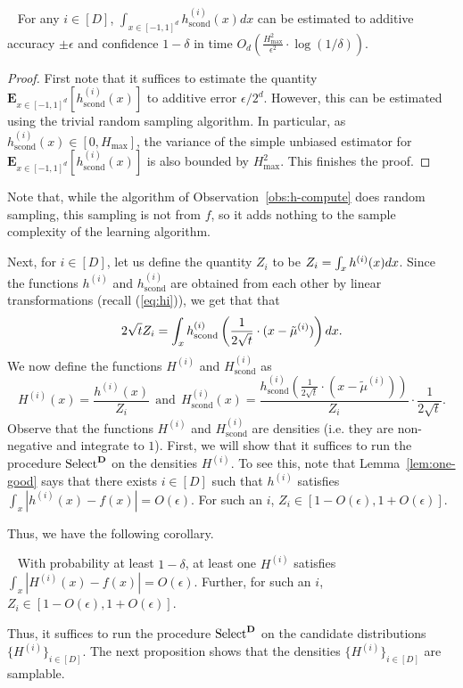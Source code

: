 \begin{observation}~\label{obs:h-compute}
For any $i \in [D]$, $\int_{x \in [-1,1]^d} {h}_{\mathrm{scond}}^{(i)} (x) dx$ can be 
estimated to additive accuracy $\pm \epsilon$  and confidence $1-\delta$  in time $O_d\left( \frac{H_{\max}^2}{\epsilon^2} \cdot \log (1/\delta)\right)$. 
\end{observation}
\begin{proof}
First note that it suffices to estimate
the quantity  $\mathbf{E}_{x \in [-1,1]^d} 
[{h}_{\mathrm{scond}}^{(i)} (x)]$ to additive error $\epsilon/2^d$. However, this can be estimated using the trivial random sampling algorithm. In particular,  as 
${h}_{\mathrm{scond}}^{(i)}(x) \in [0,H_{\max}]$, the variance of the simple unbiased estimator for $\mathbf{E}_{x \in [-1,1]^d} 
[{h}_{\mathrm{scond}}^{(i)} (x)]$ is also bounded by $H_{\max}^2$. This finishes the proof.  
\end{proof}

Note that, while the algorithm of Observation~\ref{obs:h-compute} does random sampling, this sampling
is not from $f$, so it adds nothing to the sample complexity of the learning algorithm.

Next, for $i \in [D]$, let us define the quantity $Z_i$ to be $Z_i = \int_{x\ignore{\in [-1,1]^d}} {h}^{(i)}(x) dx$. Since the functions ${h}^{(i)}$  and ${h}_{\mathrm{scond}}^{(i)}$ are obtained from each other by linear transformations (recall (\ref{eq:hi})),
we get that that 
\[
2 \sqrt{t} Z_i = \int_{x\ignore{\in [-1,1]^d}} {h}_{\mathrm{scond}}^{(i)}\left({\frac 1 {2\sqrt{t}}} \cdot (x-\tilde{\mu}^{(i)})\right) dx. 
\]
We now define the functions ${H}^{(i)}$ and ${H}_{\mathrm{scond}}^{(i)}$ as
\[
{H}^{(i)} (x) = \frac{{h}^{(i)}(x)}{Z_i} \ \ \textrm{and} \  \ {H}_{\mathrm{scond}}^{(i)}(x) = \frac{{h}_{\mathrm{scond}}^{(i)}(
{\frac 1 {2\sqrt{t}}} \cdot (x-\tilde{\mu}^{(i)}))}{Z_i} \cdot {\frac 1 {2\sqrt{t}}} .
\]
Observe that the functions ${H}^{(i)}$ and ${H}_{\mathrm{scond}}^{(i)}$ are densities (i.e. they are non-negative and integrate to $1$). 
First, we will show that it suffices to run the procedure $\mathrm{Select}^{\bD}$ on the densities ${H}^{(i)}$. 
To see this, note that  Lemma~\ref{lem:one-good} says that there exists $i \in [D]$ such that $h^{(i)}$ satisfies $\int_x |h^{(i)}(x) - f(x)| = O(\epsilon)$. For such an $i$, $Z_i \in [1-O(\epsilon), 1+ O(\epsilon)]$. 
Thus, we have the following corollary. 
\begin{corollary}~\label{corr:one-good}
With probability at least $1-\delta$, at least one ${H}^{(i)}$ satisfies $\int_x |{H}^{(i)}(x) - f(x)| = O(\epsilon)$. Further, for such an $i$, $Z_i \in [1-O(\epsilon), 1+O(\epsilon)]$. 
\end{corollary}
Thus, it suffices to run the procedure $\mathrm{Select}^{\bD}$ on the candidate distributions $\{{H}^{(i)}\}_{i \in [D]}$. The next proposition shows that 
the densities $\{  {H}^{(i)}\}_{i \in [D]}$ are samplable. 



